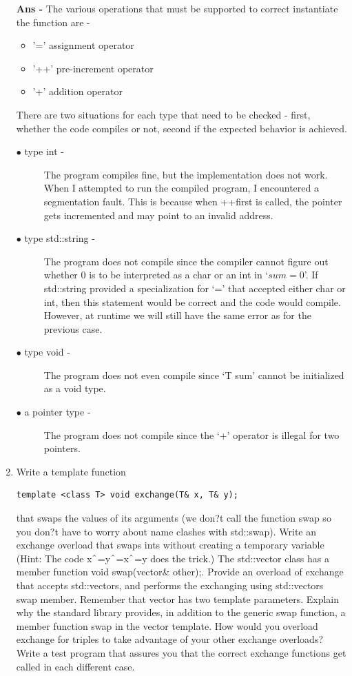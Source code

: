 \documentclass{article}
\begin{document}
\begin{enumerate}
\textbf{Ans - }The various operations that must be supported to correct instantiate the function are - 
\begin{itemize}
\item '=' assignment operator
\item '++' pre-increment operator
\item '+' addition operator 
\end{itemize}
There are two situations for each type that need to be checked - first, whether the code compiles or not, second if the expected behavior is achieved.
\begin{description}
  \item[$\bullet$ type int - ]The program compiles fine, but the implementation does not work. When I attempted to run the compiled program, I encountered a segmentation fault. This is because when ++first is called, the pointer gets incremented and may point to an invalid address.
  \item[$\bullet$ type std::string - ]The program does not compile since the compiler cannot figure out whether 0 is to be interpreted as a char or an int in `$sum = 0$'. If std::string provided a specialization for `=' that accepted either char or int, then this statement would be correct and the code would compile. However, at runtime we will still have the same error as for the previous case.
  \item[$\bullet$ type void - ]The program does not even compile since `T sum' cannot be initialized as a void type.
  \item[$\bullet$ a pointer type - ]The program does not compile since the `+' operator is illegal for two pointers. 
\end{description}

\item Write a template function
\begin{lstlisting}
template <class T> void exchange(T& x, T& y);
\end{lstlisting}
that swaps the values of its arguments (we don?t call the function swap so you don?t have to worry
about name clashes with std::swap). Write an exchange overload that swaps ints without creating
a temporary variable (Hint: The code x$\string^$=y$\string^$=x$\string^$=y does the trick.)
The std::vector class has a member function void swap(vector\& other);. Provide an overload of
exchange that accepts std::vectors, and performs the exchanging using std::vectors swap member.
Remember that vector has two template parameters.
Explain why the standard library provides, in addition to the generic swap function, a member function
swap in the vector template.
How would you overload exchange for triples to take advantage of your other exchange overloads?
Write a test program that assures you that the correct exchange functions get called in each different
case.


\end{enumerate}
\end{document}
